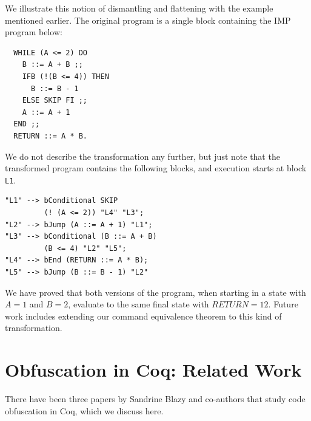 \documentclass[compsoc,conference,a4paper,10pt,times]{IEEEtran}
\begin{document}
We illustrate this notion of dismantling and flattening with the example mentioned earlier.  The original program is a single block containing the IMP program below:
\begin{verbatim}
  WHILE (A <= 2) DO
    B ::= A + B ;;
    IFB (!(B <= 4)) THEN
      B ::= B - 1
    ELSE SKIP FI ;;
    A ::= A + 1
  END ;;
  RETURN ::= A * B.
\end{verbatim}
We do not describe the transformation any further, but just note that the transformed program contains the following blocks, and execution starts at block \texttt{L1}.
\begin{verbatim}
"L1" --> bConditional SKIP
         (! (A <= 2)) "L4" "L3";
"L2" --> bJump (A ::= A + 1) "L1";
"L3" --> bConditional (B ::= A + B)
         (B <= 4) "L2" "L5";
"L4" --> bEnd (RETURN ::= A * B); 
"L5" --> bJump (B ::= B - 1) "L2"
\end{verbatim}
We have proved that both versions of the program, when starting in a state with $A = 1$ and $B = 2$, evaluate to the same final state with $RETURN = 12$. Future work includes extending our command equivalence theorem to this kind of transformation.

\section{Obfuscation in Coq: Related Work}
There have been three papers by Sandrine Blazy and co-authors that study code obfuscation in Coq, which we discuss here.
\end{document}
